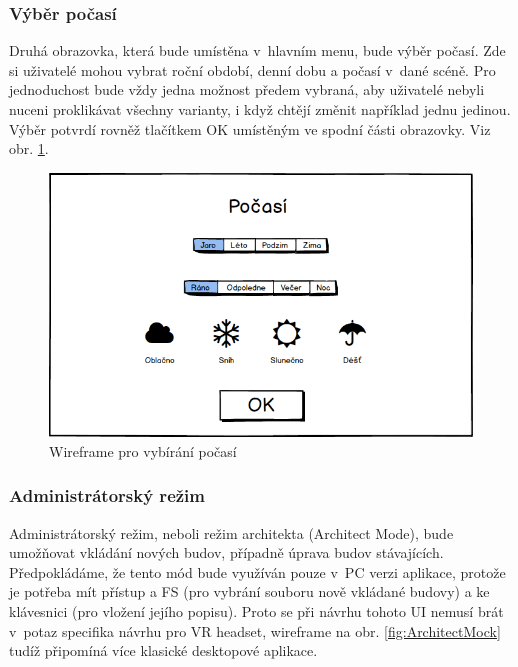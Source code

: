 \documentclass[thesis=B,czech]{FITthesis}[2012/06/26]
\begin{document}
	\subsubsection{Výběr počasí}
Druhá obrazovka, která bude umístěna v~hlavním menu, bude výběr počasí. Zde si uživatelé mohou vybrat roční období, denní dobu a počasí v~dané scéně. Pro jednoduchost bude vždy jedna možnost předem vybraná, aby uživatelé nebyli nuceni proklikávat všechny varianty, i když chtějí změnit například jednu jedinou. Výběr potvrdí rovněž tlačítkem OK umístěným ve spodní části obrazovky. Viz obr. \ref{fig:mockPocasi}.
	
	\begin{figure}
  		\includegraphics[width=\textwidth,height=\textheight,keepaspectratio]{MockPocasi.png}
  		\caption{Wireframe pro vybírání počasí}
  		\label{fig:mockPocasi}
	\end{figure}
	
	\subsubsection{Administrátorský režim}
Administrátorský režim, neboli režim architekta (Architect Mode), bude umožňovat vkládání nových budov, případně úprava budov stávajících. Předpokládáme, že tento mód bude využíván pouze v~PC verzi aplikace, protože je potřeba mít přístup a FS (pro vybrání souboru nově vkládané budovy) a ke klávesnici (pro vložení jejího popisu). Proto se při návrhu tohoto UI nemusí brát v~potaz specifika návrhu pro VR headset, wireframe na obr. \ref{fig:ArchitectMock} tudíž připomíná více klasické desktopové aplikace.
\end{document}
